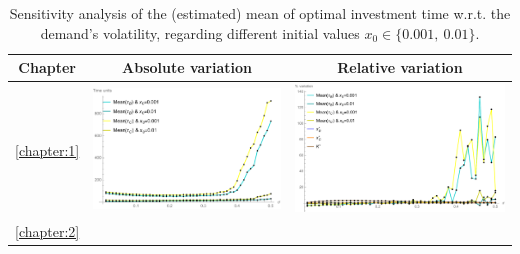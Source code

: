 \begin{table}[!htb]
	\caption{Sensitivity analysis of the (estimated) mean of optimal investment time w.r.t. the demand's volatility, regarding different initial values $x_0 \in \{0.001, \ 0.01\}$.}
	\begin{tabular}{c|c|c}
		\hline
		Chapter & Absolute variation & Relative variation \\ \hline
		\ref{chapter:1} & \begin{minipage}{.45\textwidth}
			\includegraphics[width=\linewidth]{StopTime/1_meantauSP500H1500.pdf}
		\end{minipage}
	 & \begin{minipage}{.45\textwidth}
	 	\includegraphics[width=\linewidth]{StopTime/1_varSP500H1500.pdf}
	 \end{minipage}
  \\ \hline
		\ref{chapter:2} & 
		\begin{minipage}{.45\textwidth}

\end{minipage}
\end{tabular}
\end{table}
